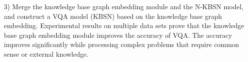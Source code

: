 \begin{englishabstract}
3) Merge the knowledge base graph embedding module and the N-KBSN model, and construct a VQA model (KBSN) based on the knowledge base graph embedding. Experimental results on multiple data sets prove that the knowledge base graph embedding module improves the accuracy of VQA. The accuracy improves significantly while processing complex problems that require common sense or external knowledge.
	
\end{englishabstract}


